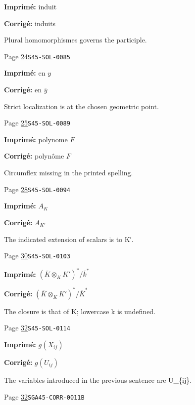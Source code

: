 \begin{description}
\par\noindent\textbf{Imprimé:} induit
\par\noindent\textbf{Corrigé:} induits
\par\noindent Plural homomorphismes governs the participle.
\smallskip
\item[\hypertarget{apparatus:FR-0012}{12}] Page \hyperlink{printpage:fr:24}{24}\quad\texttt{S45-SOL-0085}
\par\noindent\textbf{Imprimé:} en $y$
\par\noindent\textbf{Corrigé:} en $\bar y$
\par\noindent Strict localization is at the chosen geometric point.
\smallskip
\item[\hypertarget{apparatus:FR-0013}{13}] Page \hyperlink{printpage:fr:25}{25}\quad\texttt{S45-SOL-0089}
\par\noindent\textbf{Imprimé:} polynome $F$
\par\noindent\textbf{Corrigé:} polynôme $F$
\par\noindent Circumflex missing in the printed spelling.
\smallskip
\item[\hypertarget{apparatus:FR-0014}{14}] Page \hyperlink{printpage:fr:28}{28}\quad\texttt{S45-SOL-0094}
\par\noindent\textbf{Imprimé:} \(A_K\)
\par\noindent\textbf{Corrigé:} \(A_{K'}\)
\par\noindent The indicated extension of scalars is to K′.
\smallskip
\item[\hypertarget{apparatus:FR-0015}{15}] Page \hyperlink{printpage:fr:30}{30}\quad\texttt{S45-SOL-0103}
\par\noindent\textbf{Imprimé:} \((\bar K\otimes_K K')^*/\bar k^*\)
\par\noindent\textbf{Corrigé:} \((\bar K\otimes_K K')^*/\bar K^*\)
\par\noindent The closure is that of K; lowercase k is undefined.
\smallskip
\item[\hypertarget{apparatus:FR-0016}{16}] Page \hyperlink{printpage:fr:32}{32}\quad\texttt{S45-SOL-0114}
\par\noindent\textbf{Imprimé:} \(g(X_{i j})\)
\par\noindent\textbf{Corrigé:} \(g(U_{i j})\)
\par\noindent The variables introduced in the previous sentence are U\_\{ij\}.
\smallskip
\item[\hypertarget{apparatus:FR-0017}{17}] Page \hyperlink{printpage:fr:32}{32}\quad\texttt{SGA45-CORR-0011B}

\end{description}
